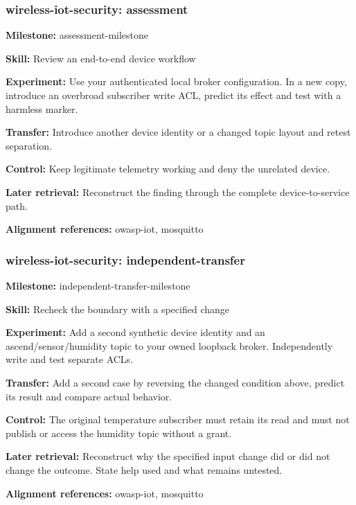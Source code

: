 \subsubsection{wireless-iot-security: assessment}
\noindent\textbf{Milestone:} assessment-milestone\par
\noindent\textbf{Skill:} Review an end-to-end device workflow\par
\noindent\textbf{Experiment:} Use your authenticated local broker configuration. In a new copy, introduce an overbroad subscriber write ACL, predict its effect and test with a harmless marker.\par
\noindent\textbf{Transfer:} Introduce another device identity or a changed topic layout and retest separation.\par
\noindent\textbf{Control:} Keep legitimate telemetry working and deny the unrelated device.\par
\noindent\textbf{Later retrieval:} Reconstruct the finding through the complete device-to-service path.\par
\noindent\textbf{Alignment references:} owasp-iot, mosquitto\par
\subsubsection{wireless-iot-security: independent-transfer}
\noindent\textbf{Milestone:} independent-transfer-milestone\par
\noindent\textbf{Skill:} Recheck the boundary with a specified change\par
\noindent\textbf{Experiment:} Add a second synthetic device identity and an ascend/sensor/humidity topic to your owned loopback broker. Independently write and test separate ACLs.\par
\noindent\textbf{Transfer:} Add a second case by reversing the changed condition above, predict its result and compare actual behavior.\par
\noindent\textbf{Control:} The original temperature subscriber must retain its read and must not publish or access the humidity topic without a grant.\par
\noindent\textbf{Later retrieval:} Reconstruct why the specified input change did or did not change the outcome. State help used and what remains untested.\par
\noindent\textbf{Alignment references:} owasp-iot, mosquitto\par
